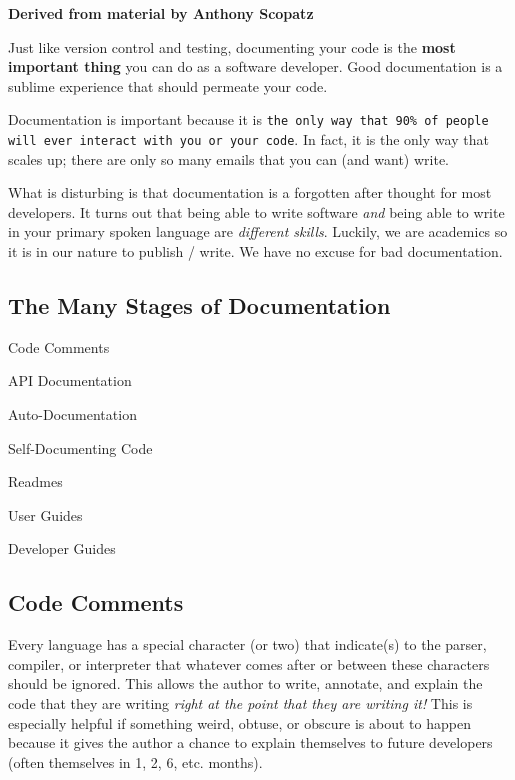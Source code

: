 {\bfseries Derived from material by Anthony Scopatz}

Just like version control and testing, documenting your code is the {\bfseries most important thing} you can do as a software developer. Good documentation is a sublime experience that should permeate your code.

Documentation is important because it is {\tt the only way that 90\% of people will ever interact with you or your code}. In fact, it is the only way that scales up; there are only so many emails that you can (and want) write.

What is disturbing is that documentation is a forgotten after thought for most developers. It turns out that being able to write software {\itshape and} being able to write in your primary spoken language are {\itshape different skills}. Luckily, we are academics so it is in our nature to publish / write. We have no excuse for bad documentation.

\subsection*{The Many Stages of Documentation}


\begin{DoxyEnumerate}
\item Code Comments
\item A\+PI Documentation
\item Auto-\/\+Documentation
\item Self-\/\+Documenting Code
\item Readmes
\item User Guides
\item Developer Guides
\end{DoxyEnumerate}

\subsection*{Code Comments}

Every language has a special character (or two) that indicate(s) to the parser, compiler, or interpreter that whatever comes after or between these characters should be ignored. This allows the author to write, annotate, and explain the code that they are writing {\itshape right at the point that they are writing it!} This is especially helpful if something weird, obtuse, or obscure is about to happen because it gives the author a chance to explain themselves to future developers (often themselves in 1, 2, 6, etc. months).

